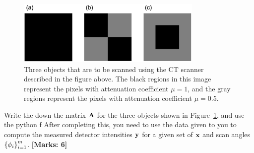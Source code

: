 \documentclass[12pt]{article}
\def\mf{\ensuremath\mathbf}
\def\lc{\ensuremath\left\{}
\def\rc{\ensuremath\right\}}
\begin{document}
\begin{enumerate}
\begin{figure}[h]
    \centering
    \includegraphics[width = 0.8\textwidth]{ct_images.png}
    \caption{Three objects that are to be scanned using the CT scanner described in the figure above. The black regions in this image represent the pixels with attenuation coefficient $\mu = 1$, and the gray regions represent the pixels with attenuation coefficient $\mu = 0.5$.}
    \label{fig:ctimages}
\end{figure}

Write the down the matrix $\mf{A}$ for the three objects shown in Figure~\ref{fig:ctimages}, and use the python f
After completing this, you need to use the data given to you to compute the measured detector intensities $\mf{y}$ for a given set of $\mf{x}$ and scan angles $\lc \phi_i \rc_{i=1}^{m}$. \textbf{[Marks: 6]}

\end{enumerate}
\end{document}
